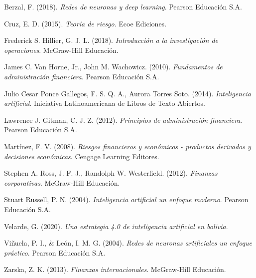 \documentclass[
  12pt,
]{article}
\newlength{\cslhangindent}
\newlength{\cslentryspacingunit} %
\newenvironment{CSLReferences}[2] %
 {%
  \setlength{\parindent}{0pt}
  \ifodd #1
  \let\oldpar\par
  \def\par{\hangindent=\cslhangindent\oldpar}
  \fi
  \setlength{\parskip}{#2\cslentryspacingunit}
 }%
 {}
\begin{document}
\hypertarget{refs}{}
\begin{CSLReferences}{1}{0}
\leavevmode{}%
Berzal, F. (2018). \emph{Redes de neuronas y deep learning}. Pearson
Educación S.A.

\leavevmode{}%
Cruz, E. D. (2015). \emph{Teoría de riesgo}. Ecoe Ediciones.

\leavevmode{}%
Frederick S. Hillier, G. J. L. (2018). \emph{Introducción a la
investigación de operaciones}. McGraw-Hill Educación.

\leavevmode{}%
James C. Van Horne, Jr., John M. Wachowicz. (2010). \emph{Fundamentos de
administración financiera}. Pearson Educación S.A.

\leavevmode{}%
Julio Cesar Ponce Gallegos, F. S. Q. A., Aurora Torres Soto. (2014).
\emph{Inteligencia artificial}. Iniciativa Latinoamericana de Libros de
Texto Abiertos.

\leavevmode{}%
Lawrence J. Gitman, C. J. Z. (2012). \emph{Principios de administración
financiera}. Pearson Educación S.A.

\leavevmode{}%
Martínez, F. V. (2008). \emph{Riesgos financieros y económicos -
productos derivados y decisiones económicas}. Cengage Learning Editores.

\leavevmode{}%
Stephen A. Ross, J. F. J., Randolph W. Westerfield. (2012).
\emph{Finanzas corporativas}. McGraw-Hill Educación.

\leavevmode{}%
Stuart Russell, P. N. (2004). \emph{Inteligencia artificial un enfoque
moderno}. Pearson Educación S.A.

\leavevmode{}%
Velarde, G. (2020). \emph{Una estrategia 4.0 de inteligencia artificial
en bolivia}.

\leavevmode{}%
Viñuela, P. I., \& León, I. M. G. (2004). \emph{Redes de neuronas
artificiales un enfoque práctico}. Pearson Educación S.A.

\leavevmode{}%
Zarska, Z. K. (2013). \emph{Finanzas internacionales}. McGraw-Hill
Educación.

\end{CSLReferences}
\end{document}
